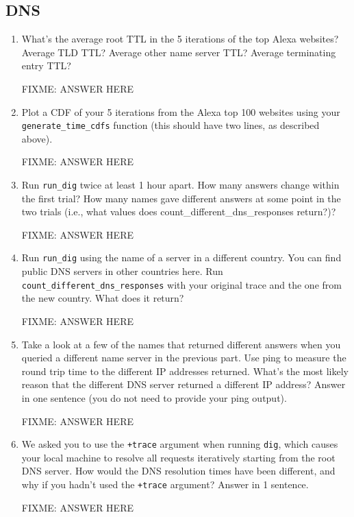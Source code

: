 \documentclass[10pt]{article}
\begin{document}
\newpage
\subsection*{DNS}

\begin{enumerate}

\item What's the average root TTL in the 5 iterations of the top Alexa websites? Average TLD TTL? Average other name server TTL? Average terminating entry TTL?

FIXME: ANSWER HERE

\item Plot a CDF of your 5 iterations from the Alexa top 100 websites using your \texttt{generate\_time\_cdfs} function (this should have two lines, as described above).

FIXME: ANSWER HERE

\item Run \texttt{run\_dig} twice at least 1 hour apart. How many answers change within the first trial? How many names gave different answers at some point in the two trials (i.e., what values does {count\_different\_dns\_responses} return?)?

FIXME: ANSWER HERE

\item Run \texttt{run\_dig} using the name of a server in a different country. You can find public DNS servers in other countries here. 
Run \texttt{count\_different\_dns\_responses} with your original trace and the one from the new country. What does it return?

FIXME: ANSWER HERE

\item Take a look at a few of the names that returned different answers when you queried a different name server in the previous part. Use ping to measure the round trip time to the different IP addresses returned. What's the most likely reason that the different DNS server returned a different IP address? Answer in one sentence (you do not need to provide your ping output).

FIXME: ANSWER HERE

\item We asked you to use the \texttt{+trace} argument when running \texttt{dig}, which causes your local machine to resolve all requests iteratively starting from the root DNS server. How would the DNS resolution times have been different, and why if you hadn't used the \texttt{+trace} argument? Answer in 1 sentence.

FIXME: ANSWER HERE

\end{enumerate}
\end{document}
